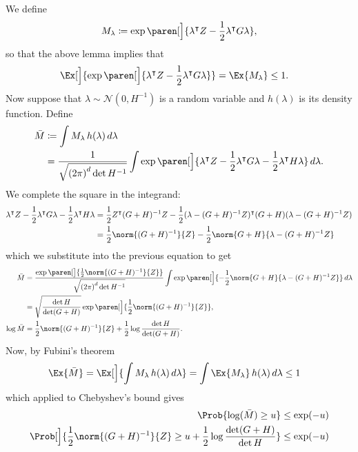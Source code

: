 \documentclass{article}
\newcommand{\defeq}{\coloneq}
\newcommand{\inv}[1]{#1^{-1}}
\DeclarePairedDelimiter{\paren}()
\newcommand{\transp}[1]{#1^\intercal}
\begin{document}
We define
\begin{align*}
  M_\lambda \defeq \exp\paren[\Big]{\transp{\lambda}Z - \frac{1}{2}\transp{\lambda}G\lambda},
\end{align*}
so that the above lemma implies that
\begin{align*}
  \Ex[\Big]{\exp\paren[\Big]{\transp{\lambda}Z - \frac{1}{2}\transp{\lambda}G\lambda}} &= \Ex{M_\lambda} \le 1.
\end{align*}
Now suppose that $\lambda\sim\mathcal{N}(0, \inv{H})$ is a random
variable and $h(\lambda)$ is its density function.  Define
\begin{align*}
  \bar{M}
  &\defeq \int M_\lambda \,h(\lambda)\,d\lambda \\
  &= \frac{1}{\sqrt{{(2\pi)}^d \det\inv{H}}} \int\exp\paren[\Big]{\transp{\lambda}Z
    - \frac{1}{2}\transp{\lambda}G\lambda
    - \frac{1}{2}\transp{\lambda}H\lambda
    } \,d\lambda.
\end{align*}
We complete the square in the integrand:
\begin{align*}
  \transp{\lambda}Z - \frac{1}{2}\transp{\lambda}G\lambda - \frac{1}{2}\transp{\lambda}H\lambda
  &= \frac{1}{2}\transp{Z}\inv{(G+H)}Z - \frac{1}{2}\transp{(\lambda - \inv{(G+H)}Z)}(G+H)(\lambda-\inv{(G+H)}Z) \\
  &= \frac{1}{2} \norm{\inv{(G+H)}}{Z} - \frac{1}{2}\norm{G+H}{\lambda-\inv{(G+H)}Z}
\end{align*}
which we substitute into the previous equation to get
\begin{align*}
  \bar{M}
  &= \frac{\exp\paren[\big]{\frac{1}{2} \norm{\inv{(G+H)}}{Z}}}{\sqrt{{(2\pi)}^d \det\inv{H}}}
    \int \exp\paren[\Big]{-\frac{1}{2} \norm{G+H}{\lambda-\inv{(G+H)}Z}} \,d\lambda \\
  &= \sqrt{\frac{\det H}{\det(G+H)}} \exp\paren[\Big]{\frac{1}{2}\norm{\inv{(G+H)}}{Z}}, \\
  \log\bar{M} &= \frac{1}{2}\norm{\inv{(G+H)}}{Z} + \frac{1}{2}\log\frac{\det H}{\det(G+H)}.
\end{align*}
Now, by Fubini's theorem
\begin{align*}
  \Ex{\bar{M}} &= \Ex[\Big]{\int M_\lambda\,h(\lambda)\,d\lambda} = \int \Ex{M_\lambda} \,h(\lambda)\,d\lambda \le 1
\end{align*}
which applied to Chebyshev's bound gives
\begin{align*}
  \Prob{\log(\bar{M}) \ge u} &\le \exp(-u) \\
  \Prob[\Big]{\frac{1}{2}\norm{\inv{(G+H)}}{Z} \ge u + \frac{1}{2}\log\frac{\det(G+H)}{\det H}} &\le \exp(-u)
\end{align*}
\end{document}
